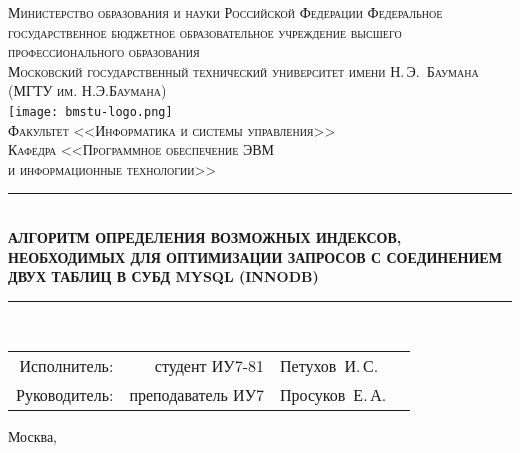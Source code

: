 \newcommand{\HRule}{\rule{\linewidth}{0.5mm}}

\begin{center}

\textsc{Министерство образования и науки Российской Федерации
Федеральное государственное бюджетное образовательное учреждение 
высшего профессионального образования}\\[0.5cm]

\textsc{\large Московский государственный технический университет имени Н.\,Э.~Баумана}\\
\textsc{(МГТУ им. Н.Э.Баумана)}\\[0.5cm]
\texttt{[image: bmstu-logo.png]}~\\

\textsc{Факультет <<Информатика и системы управления>>}\\
\textsc{Кафедра <<Программное обеспечение ЭВМ\\и информационные технологии>>}\\[1cm]

\HRule \\[0.5cm]
{\huge \bfseries АЛГОРИТМ ОПРЕДЕЛЕНИЯ ВОЗМОЖНЫХ ИНДЕКСОВ, НЕОБХОДИМЫХ ДЛЯ ОПТИМИЗАЦИИ ЗАПРОСОВ С СОЕДИНЕНИЕМ ДВУХ ТАБЛИЦ В СУБД MYSQL (INNODB)}
\HRule \\[0.5cm]

\vfill

\begin{flushright}
  \begin{tabular}{rrlc}
    Исполнитель:  &    студент ИУ7-81 & Петухов~И.\,С.  & \underline{\hspace{3cm}} \\[1cm]
    Руководитель: & преподаватель ИУ7 & Просуков~Е.\,А. & \underline{\hspace{3cm}} \\[1cm]
  \end{tabular}
\end{flushright}

{\large Москва, \the\year}

\end{center}

\newpage
{}